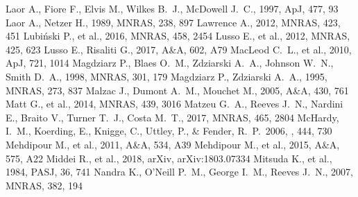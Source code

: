 \documentclass[a4paper,fleqn,usenatbib]{mnras}
\begin{document}
\begin{thebibliography}{99}
 Laor A., Fiore F., Elvis M., Wilkes B.~J., McDowell J.~C., 1997, ApJ, 477, 93 
 Laor A., Netzer H., 1989, MNRAS, 238, 897 
 Lawrence A., 2012, MNRAS, 423, 451 
 Lubi{\'n}ski P., et al., 2016, MNRAS, 458, 2454 
 Lusso E., et al., 2012, MNRAS, 425, 623 
 Lusso E., Risaliti G., 2017, A\&A, 602, A79 
 MacLeod C.~L., et al., 2010, ApJ, 721, 1014 
 Magdziarz P., Blaes O.~M., Zdziarski A.~A., Johnson W.~N., Smith D.~A., 1998, MNRAS, 301, 179 %
 Magdziarz P., Zdziarski A.~A., 1995, MNRAS, 273, 837 
 Malzac J., Dumont A.~M., Mouchet M., 2005, A\&A, 430, 761 
 Matt G., et al., 2014, MNRAS, 439, 3016 
 Matzeu G.~A., Reeves J.~N., Nardini E., Braito V., Turner T.~J., Costa M.~T., 2017, MNRAS, 465, 2804 
McHardy, I.~M., Koerding, E., Knigge, C., Uttley, P., \& Fender, R.~P.\ 2006, \nat, 444, 730 
 Mehdipour M., et al., 2011, A\&A, 534, A39 
 Mehdipour M., et al., 2015, A\&A, 575, A22 
 Middei R., et al., 2018, arXiv, arXiv:1803.07334 %
 Mitsuda K., et al., 1984, PASJ, 36, 741 
 Nandra K., O'Neill P.~M., George I.~M., Reeves J.~N., 2007, MNRAS, 382, 194 %

\end{thebibliography}
\end{document}
